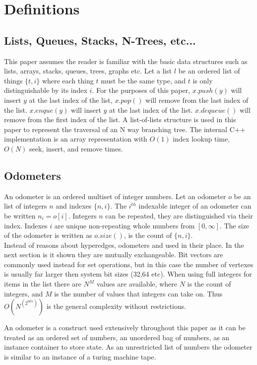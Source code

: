 \chapter{Definitions}

\section{Lists, Queues, Stacks, N-Trees, etc...}
This paper assumes the reader is familiar with the basic data structures such as lists, arrays, stacks, queues, trees, graphs etc. Let a list $l$ be an ordered list of things $\{t,i\}$ where each thing $t$ must be the same type, and $t$ is only distinguishable by its index $i$. For the purposes of this paper, $x.push(y)$ will insert $y$ at the last index of the list, $x.pop()$ will remove from the last index of the list.  $x.enque(y)$ will insert $y$ at the last index of the list. $x.dequeue()$ will remove from the first index of the list. A list-of-lists structure is used in this paper to represent the traversal of an N way branching tree. The internal C++ implementation is an array representation with $O(1)$ index lookup time, $O(N)$ seek, insert, and remove times.

\section{Odometers }

An odometer is an ordered multiset of integer numbers. Let an odometer $o$ be an list of integers $n$ and indexes $\{n,i\}$. The $i^{th}$ indexable integer of an odometer can be written $n_i = o[i]$. Integers $n$ can be repeated, they are distinguished via their index. Indexes $i$ are unique non-repeating whole numbers from $[0,\infty]$. The size of the odometer is written as $o.size()$, is the count of $\{n,i\}$. \\

Instead of reasons about hyperedges, odometers and used in their place. In the next section is it shown they are mutually exchangeable. Bit vectors are commonly used instead for set operations, but in this case the number of vertexes is usually far larger then system bit sizes (32,64 etc). When using full integers for items in the list there are $N^M$ values are available, where $N$ is the count of integers, and $M$ is the number of values that integers can take on. Thus $O(N^{(2^{bits})})$ is the general complexity without restrictions. \cite{Odometer:Fuchs}

An odometer is a construct used extensively throughout this paper as it can be treated as an ordered set of numbers, an unordered bag of numbers, as an instance container to store state. As an unrestricted list of numbers the odometer is similar to an instance of a turing machine tape. \\

